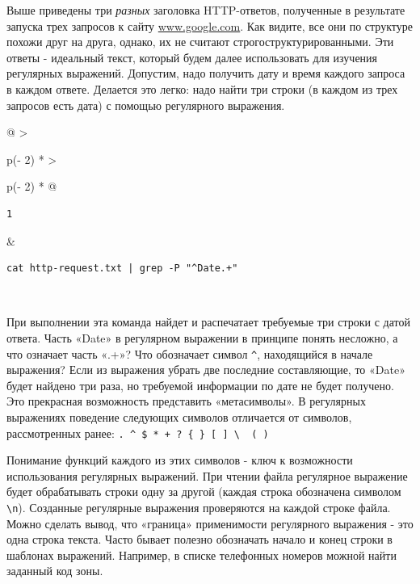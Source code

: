 \documentclass{report}
\begin{document}
Выше приведены три \emph{разных} заголовка HTTP-ответов, полученные в
результате запуска трех запросов к сайту
\href{http://www.google.com}{www.google.com}. Как видите, все они по
структуре похожи друг на друга, однако, их не считают
строгоструктурированными. Эти ответы - идеальный текст, который будем
далее использовать для изучения регулярных выражений. Допустим, надо
получить дату и время каждого запроса в каждом ответе. Делается это
легко: надо найти три строки (в каждом из трех запросов есть дата) с
помощью регулярного выражения.

\begin{longtable}[]{@{}
  >{\raggedright\arraybackslash}p{(\columnwidth - 2\tabcolsep) * }
  >{\raggedright\arraybackslash}p{(\columnwidth - 2\tabcolsep) * }@{}}
\toprule
\endhead
\begin{minipage}[t]{\linewidth}\raggedright
\begin{verbatim}
1
\end{verbatim}
\end{minipage} & \begin{minipage}[t]{\linewidth}\raggedright
\begin{verbatim}
cat http-request.txt | grep -P "^Date.+"
\end{verbatim}
\end{minipage} \\ \addlinespace
\bottomrule
\end{longtable}

При выполнении эта команда найдет и распечатает требуемые три строки с
датой ответа. Часть «Date» в регулярном выражении в принципе понять
несложно, а что означает часть «.+»? Что обозначает символ
\texttt{\^{}}, находящийся в начале выражения? Если из выражения убрать
две последние составляющие, то «Date» будет найдено три раза, но
требуемой информации по дате не будет получено. Это прекрасная
возможность представить «метасимволы». В регулярных выражениях поведение
следующих символов отличается от символов, рассмотренных ранее:
\texttt{.\ \^{}\ \$\ *\ +\ ?\ \{\ \}\ {[}\ {]}\ \textbackslash{}\ \textbar{}\ (\ )}

Понимание функций каждого из этих символов - ключ к возможности
использования регулярных выражений. При чтении файла регулярное
выражение будет обрабатывать строки одну за другой (каждая строка
обозначена символом \texttt{\textbackslash{}n}). Созданные регулярные
выражения проверяются на каждой строке файла. Можно сделать вывод, что
«граница» применимости регулярного выражения - это одна строка текста.
Часто бывает полезно обозначать начало и конец строки в шаблонах
выражений. Например, в списке телефонных номеров можной найти заданный
код зоны.
\end{document}
